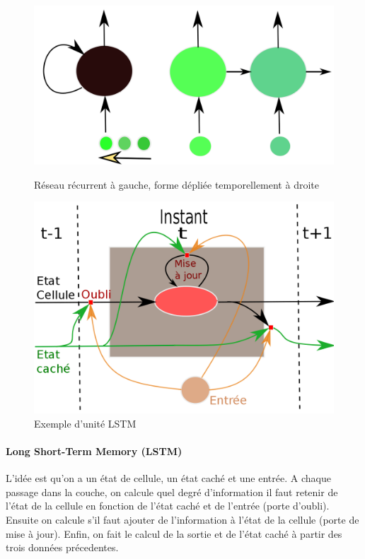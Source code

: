 \documentclass[a4paper, 11pt, onecolumn]{article}
\begin{document}
\begin{figure}[!tbp]
  \centering
  \begin{minipage}[b]{0.45\textwidth}
    \includegraphics[width=\textwidth]{Recurrent}
    \caption{Réseau récurrent à gauche, forme dépliée temporellement à droite}
  \end{minipage}
  \hfill
  \begin{minipage}[b]{0.5\textwidth}
    \includegraphics[width=\textwidth]{LSTM}
    \caption{Exemple d'unité LSTM}
  \end{minipage}

\end{figure}

\paragraph{Long Short-Term Memory (LSTM)}

L'idée est qu'on a un état de
cellule, un état caché et une entrée. A chaque passage dans la couche, on calcule
quel degré d'information il faut retenir de l'état de la cellule en fonction de
l'état caché et de l'entrée (porte d'oubli). Ensuite on calcule s'il faut ajouter de
l'information à l'état de la cellule (porte de mise à jour). Enfin, on fait le calcul de la sortie et
de l'état caché à partir des trois données précedentes.
\end{document}
